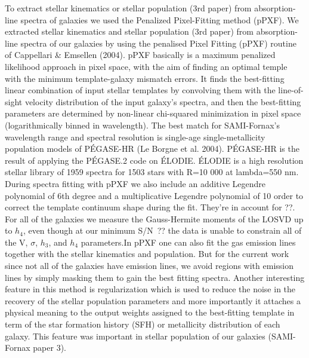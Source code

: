 \documentclass{aa}
\begin{document}
To extract stellar kinematics or stellar population (3rd paper) from absorption-line spectra of galaxies we used the Penalized Pixel-Fitting method (pPXF). 
We extracted stellar kinematics  and stellar population (3rd paper) from absorption-line spectra of our galaxies by using the penalised Pixel Fitting (pPXF) routine of Cappellari \& Emsellen (2004). pPXF basically is a maximum penalized likelihood approach in pixel space, with the aim of finding an optimal temple with the minimum template-galaxy mismatch errors. It finds the best-fitting linear combination of input stellar templates by convolving them with the line-of-sight velocity distribution of the input galaxy's spectra, and then the best-fitting parameters are determined by non-linear chi-squared minimization in pixel space (logarithmically binned in wavelength). The best match for SAMI-Fornax's wavelength range and spectral resolution is single-age single-metallicity population models of PÉGASE-HR (Le Borgne et al. 2004). PÉGASE-HR is the result of applying the PÉGASE.2 code on ÉLODIE.  ÉLODIE is a high resolution stellar library of 1959 spectra for 1503 stars with R=10 000 at lambda=550 nm.
\\ During spectra fitting with pPXF we also include an additive Legendre polynomial of 6th degree and a multiplicative Legendre polynomial of 10 order to correct the template continuum shape during the fit. They're in account for ??. For all of the galaxies we measure the Gauss-Hermite moments of the LOSVD up to $h_4$, even though at our minimum S/N~?? the data is unable to constrain all of the V, $\sigma$, $h_3$, and $h_4$ parameters.In pPXF one can also fit the gas emission lines together with the stellar kinematics and population. But for the current work since not all of the galaxies have emission lines, we avoid regions with emission lines by simply masking them to gain the best fitting spectra. Another interesting feature in this method is regularization which is used to reduce the noise in the recovery of the stellar population parameters and more importantly it attaches a physical meaning to the output weights assigned to the best-fitting template in term of the star formation history (SFH) or metallicity distribution of each galaxy. This feature was important in stellar population of our galaxies (SAMI-Fornax paper 3).
\end{document}
